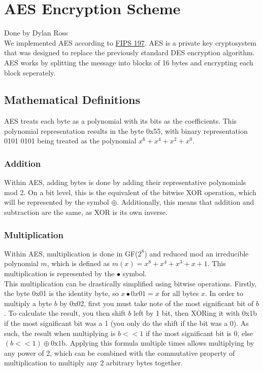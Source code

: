 \section{AES Encryption Scheme}\label{sec:aes}
Done by Dylan Ross\\

	\medskip
	We implemented AES according to \href{https://nvlpubs.nist.gov/nistpubs/FIPS/NIST.FIPS.197.pdf}{FIPS 197}. AES is a private key cryptosystem that was designed to replace the previously
	standard DES encryption algorithm. AES works by splitting the message into blocks of 16 bytes and encrypting each block seperately.

	\subsection{Mathematical Definitions}\label{sec:aes-math}
		AES treats each byte as a polynomial with its bits as the coefficients. This polynomial representation results in the byte 0x55, with binary representation 0101 0101 being treated as 
		the polynomial $x^6+x^4+x^2+x^0$.

		\subsubsection{Addition}\label{sec:aes-add}
			Within AES, adding bytes is done by adding their representative polynomials mod 2. On a bit level, this is the equivalent of the bitwise XOR operation, which will be represented by
			the symbol $\oplus$. Additionally, this means that addition and subtraction are the same, as XOR is its own inverse.

		\subsubsection{Multiplication}\label{sec:aes-mult}
			Within AES, multiplication is done in GF($2^8$) and reduced mod an irreducible polynomial $m$, which is defined as $m(x)=x^8+x^4+x^3+x+1$. This multiplication is represented by the
			$\bullet$ symbol.\\

			This multiplication can be drastically simplified using bitwise operations. Firstly, the byte 0x01 is the identity byte, so $x\bullet0x01=x$ for all bytes $x$. In order to multiply
			a byte $b$ by 0x02, first you must take note of the most significant bit of $b$. To calculate the result, you then shift $b$ left by 1 bit, then XORing it with 0x1b if the most
			significant bit was a 1 (you only do the shift if the bit was a 0). As such, the result when multiplying is $b<<1$ if the most significant bit is 0, else $(b<<1)\oplus\text{0x1b}$.
			Applying this formula multiple times allows multiplying by any power of 2, which can be combined with the commutative property of multiplication to multiply any 2 arbitrary bytes
			together.


